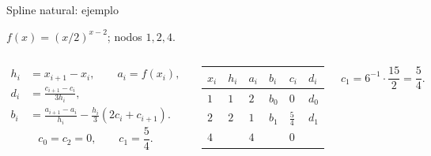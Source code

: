 \documentclass[original_version/main.tex]{subfiles}
\begin{document}
\begin{frame}[t]{Spline natural: ejemplo}
\par\noindent\begin{minipage}[t][9mm][t]{\textwidth}\small\strut $f(x)=(x/2)^{x-2}$; nodos $1,2,4$.\end{minipage}\par\nointerlineskip
\begin{columns}[T]\scriptsize\begin{align*}
h_i&=x_{i+1}-x_i,\qquad a_i=f(x_i),\\
d_i&=\frac{c_{i+1}-c_i}{3h_i},\\
b_i&=\frac{a_{i+1}-a_i}{h_i}-\frac{h_i}{3}(2c_i+c_{i+1}).
\end{align*}\scriptsize\[c_0=c_2=0,\qquad c_1=\frac54.\]\begin{minipage}[t]{\textwidth}\begingroup\scriptsize\setlength{\tabcolsep}{2pt}\begin{center}\begin{tabular}{|C{.12\textwidth}|C{.12\textwidth}|C{.12\textwidth}|C{.12\textwidth}|C{.12\textwidth}|C{.12\textwidth}|}\hline
\rule[-2mm]{0pt}{6mm}$x_i$&$h_i$&$a_i$&$b_i$&$c_i$&$d_i$\\\hline
\rule[-2.5mm]{0pt}{7mm}$1$&$1$&$2$&$b_0$&$0$&$d_0$\\\hline
\rule[-2.5mm]{0pt}{7mm}$2$&$2$&$1$&$b_1$&$\frac{5}{4}$&$d_1$\\\hline
\rule[-2.5mm]{0pt}{7mm}$4$&&$4$&&$0$&\\\hline
\end{tabular}\end{center}\endgroup\end{minipage}\par
\scriptsize\[c_1=6^{-1}\cdot\frac{15}{2}=\frac54.\]\end{columns}
\end{frame}
\end{document}
